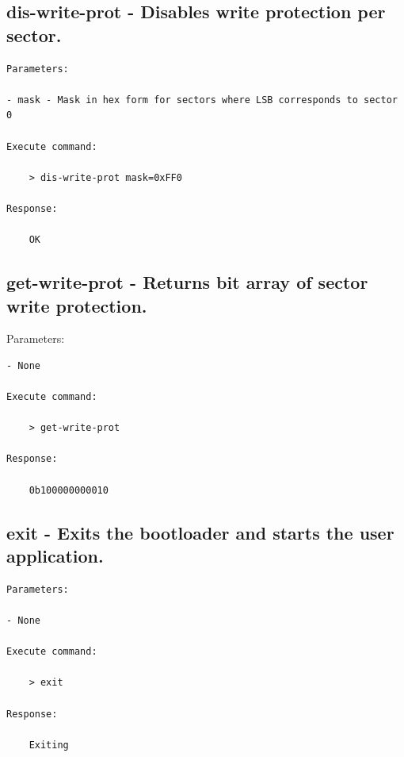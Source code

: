 \subsection{dis-write-prot - Disables write protection per sector.}
\label{bl_cmd:dis-write-prot}

\begin{lstlisting}
Parameters:

- mask - Mask in hex form for sectors where LSB corresponds to sector 0

Execute command: 

    > dis-write-prot mask=0xFF0
    
Response: 

    OK
\end{lstlisting}

\subsection{get-write-prot - Returns bit array of sector write protection.}
\label{bl_cmd:get-write-prot}Parameters:

\begin{lstlisting}
- None

Execute command: 

    > get-write-prot
    
Response: 

    0b100000000010
\end{lstlisting}

\subsection{exit - Exits the bootloader and starts the user application.}
\label{bl_cmd:exit}

\begin{lstlisting}
Parameters:

- None

Execute command: 

    > exit  
    
Response: 

    Exiting
\end{lstlisting}
